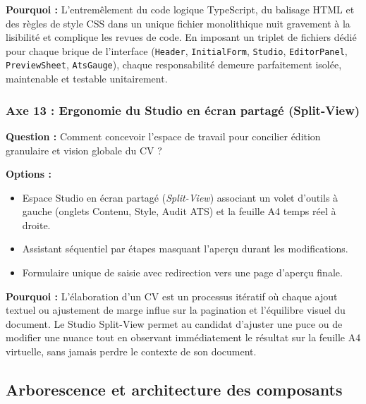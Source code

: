 \documentclass[11pt,a4paper]{article}
\begin{document}
\textbf{Pourquoi :} L'entremêlement du code logique TypeScript, du balisage HTML et des règles de style CSS dans un unique fichier monolithique nuit gravement à la lisibilité et complique les revues de code. En imposant un triplet de fichiers dédié pour chaque brique de l'interface (\texttt{Header}, \texttt{InitialForm}, \texttt{Studio}, \texttt{EditorPanel}, \texttt{PreviewSheet}, \texttt{AtsGauge}), chaque responsabilité demeure parfaitement isolée, maintenable et testable unitairement.

\subsubsection{Axe 13 : Ergonomie du Studio en écran partagé (Split-View)}
\textbf{Question :} Comment concevoir l'espace de travail pour concilier édition granulaire et vision globale du CV ?

\textbf{Options :}
\begin{itemize}
    \item[$\boxtimes$] Espace Studio en écran partagé (\textit{Split-View}) associant un volet d'outils à gauche (onglets Contenu, Style, Audit ATS) et la feuille A4 temps réel à droite.
    \item[$\square$] Assistant séquentiel par étapes masquant l'aperçu durant les modifications.
    \item[$\square$] Formulaire unique de saisie avec redirection vers une page d'aperçu finale.
\end{itemize}

\textbf{Pourquoi :} L'élaboration d'un CV est un processus itératif où chaque ajout textuel ou ajustement de marge influe sur la pagination et l'équilibre visuel du document. Le Studio Split-View permet au candidat d'ajuster une puce ou de modifier une nuance tout en observant immédiatement le résultat sur la feuille A4 virtuelle, sans jamais perdre le contexte de son document.

\subsection{Arborescence et architecture des composants}
\end{document}
